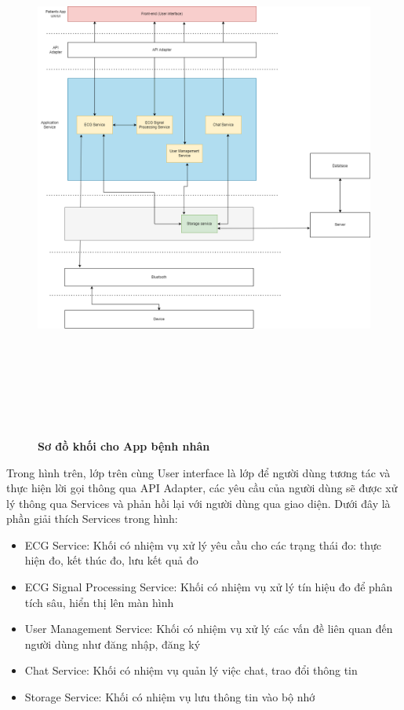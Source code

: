 \begin{figure}[H]
  \centering
  \includegraphics[width=16cm,height=18cm]{Images/system/fmECG_architecture-Patient.drawio.png}
  \caption[Sơ đồ khối cho App bệnh nhân]{\bfseries \fontsize{12pt}{0pt}\selectfont Sơ đồ khối cho App bệnh nhân}
  \label{fmECG_architecture-Patient} %
\end{figure}

Trong hình trên, lớp trên cùng User interface là lớp để người dùng tương tác và thực hiện lời gọi thông qua API Adapter, 
các yêu cầu của người dùng sẽ được xử lý thông qua Services và phản hồi lại với người dùng qua giao diện. Dưới đây là phần
giải thích Services trong hình:

\begin{itemize}
  \item ECG Service: Khối có nhiệm vụ xử lý yêu cầu cho các trạng thái đo: thực hiện đo, kết thúc đo, lưu kết quả đo
  \item ECG Signal Processing Service: Khối có nhiệm vụ xử lý tín hiệu đo để phân tích sâu, hiển thị lên màn hình
  \item User Management Service: Khối có nhiệm vụ xử lý các vấn đề liên quan đến người dùng như đăng nhập, đăng ký
  \item Chat Service: Khối có nhiệm vụ quản lý việc chat, trao đổi thông tin
  \item Storage Service: Khối có nhiệm vụ lưu thông tin vào bộ nhớ
\end{itemize}

